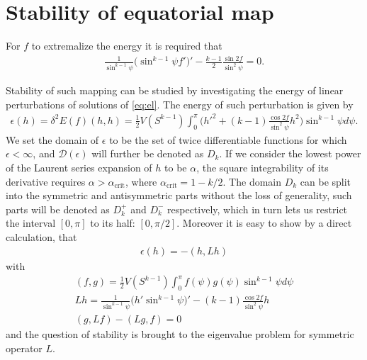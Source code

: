 \section*{Stability of equatorial map}

For $f$ to extremalize the energy it is required that
\begin{gather}\label{eq:el}
  \frac{1}{\sin^{k-1}\psi}\big(\sin^{k-1}\psi
  f'\big)'-\frac{k-1}{2}\frac{\sin 2 f}{\sin^2\psi}=0.
\end{gather}

Stability of such mapping can be studied by investigating the energy
of linear perturbations of solutions of \eqref{eq:el}. The energy of
such perturbation is given by
\begin{gather}\label{eq:infE}
  \epsilon(h)=\delta^2E(f)(h,h)=\frac{1}{2}V(S^{k-1})\int_0^{\pi}\bigg(h'^2+(k-1)\frac{\cos
    2f}{\sin^2\psi }h^2\bigg)\sin^{k-1}\psi d\psi.
\end{gather}
We set the domain of $\epsilon$ to be the set of twice differentiable
functions for which $\epsilon<\infty$, and $\mathcal{D}(\epsilon)$
will further be denoted as $D_k$. If we consider the lowest power of
the Laurent series expansion of $h$ to be $\alpha$, the square
integrability of its derivative requires
$\alpha>\alpha_{\text{crit}}$, where $\alpha_{\text{crit}}=1-k/2$. The
domain $D_k$ can be split into the symmetric and antisymmetric
parts without the loss of generality, such parts will be denoted as
$D^+_k$ and $D^-_k$ respectively, which in turn lets us restrict the
interval $[0,\pi]$ to its half: $[0,\pi/2]$. Moreover it is easy to
show by a direct calculation, that
\begin{gather}
  \epsilon(h)=-(h,Lh)
\end{gather}
with
\begin{gather}
  (f,g)=\frac{1}{2}V(S^{k-1})\int_0^\pi f(\psi) g(\psi) \sin^{k-1}\psi d\psi\\
  Lh=\frac{1}{\sin^{k-1}\psi}\big(h'\sin^{k-1}\psi\big)'-(k-1)\frac{\cos 2 f}{\sin^2\psi}h\\
  (g,Lf)-(Lg,f)=0
\end{gather}
and the question of stability is brought to the eigenvalue problem for
symmetric operator $L$.\\

